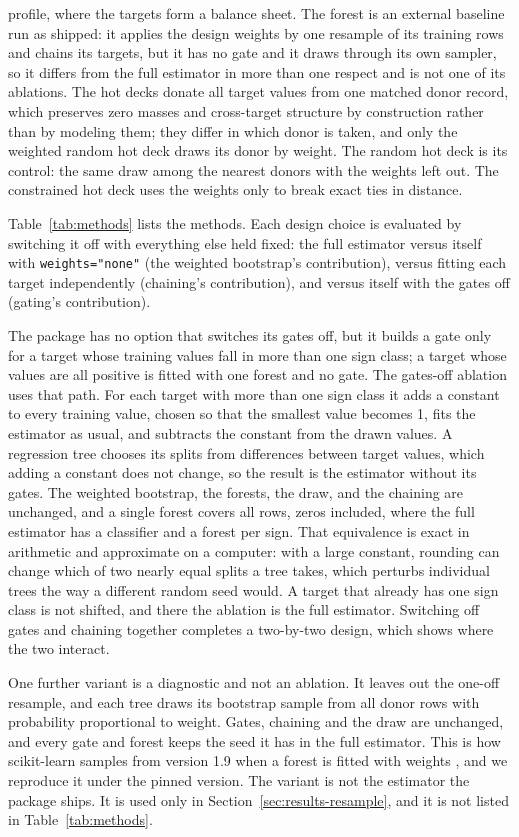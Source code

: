 {profile, where the targets form a balance sheet. The \microimpute{} forest is
an external baseline run as shipped: it applies the design weights by one
resample of its training rows and chains its targets, but it has no gate
and it draws through its own sampler, so it differs from the full
estimator in more than one respect and is not one of its ablations. The hot decks donate all target
values from one matched donor record, which preserves zero masses and
cross-target structure by construction rather than by modeling them; they
differ in which donor is taken, and only the weighted random hot deck draws
its donor by weight. The random hot deck is its control: the same draw among
the nearest donors with the weights left out. The constrained hot deck uses
the weights only to break exact ties in distance.}

Table~\ref{tab:methods} lists the methods. Each design choice is
evaluated by switching it off with everything else held fixed: the full
estimator versus itself with \texttt{weights="none"} (the weighted
bootstrap's contribution), versus fitting each target independently
(chaining's contribution), and versus itself with the gates off (gating's
contribution).

The package has no option that switches its gates off, but it builds a
gate only for a target whose training values fall in more than one sign
class; a target whose values are all positive is fitted with one forest and
no gate. The gates-off ablation uses that path. For each target with more
than one sign class it adds a constant to every training value, chosen so
that the smallest value becomes 1, fits the estimator as usual, and subtracts
the constant from the drawn values. A regression tree chooses its splits
from differences between target values, which adding a constant does not
change, so the result is the estimator without its gates. The weighted
bootstrap, the forests, the draw, and the chaining are unchanged, and a
single forest covers all rows, zeros included, where the full estimator has
a classifier and a forest per sign. That equivalence is exact in arithmetic
and approximate on a computer: with a large constant, rounding can change
which of two nearly equal splits a tree takes, which perturbs individual
trees the way a different random seed would. A target that already has one
sign class is not shifted, and there the ablation is the full estimator.
Switching off gates and chaining together completes a two-by-two design,
which shows where the two interact.

One further variant is a diagnostic and not an ablation. It leaves out the
one-off resample, and each tree draws its bootstrap sample from all donor
rows with probability proportional to weight. Gates, chaining and the draw
are unchanged, and every gate and forest keeps the seed it has in the full
estimator. This is how scikit-learn samples from version 1.9 when a forest
is fitted with weights \citep{pedregosa2011scikit}, and we reproduce it
under the pinned version. The variant is not the estimator the package
ships. It is used only in Section~\ref{sec:results-resample}, and it is not
listed in Table~\ref{tab:methods}.

